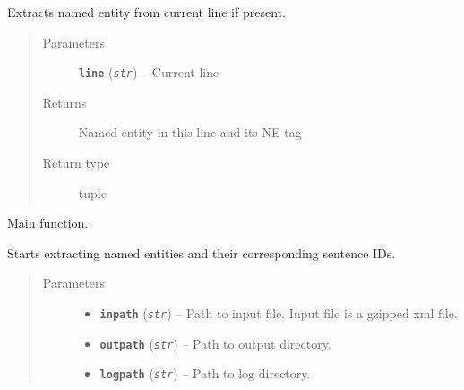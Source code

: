 \documentclass[letterpaper,10pt,english]{sphinxmanual}
\begin{document}
\begin{fulllineitems}
\label{src.prep.nes:src.prep.nes.extract_nes.extract_named_entity}
Extracts named entity from current line if present.
\begin{quote}\begin{description}
\item[{Parameters}] \leavevmode
\textbf{\texttt{line}} (\emph{\texttt{str}}) -- Current line

\item[{Returns}] \leavevmode
Named entity in this line and its NE tag

\item[{Return type}] \leavevmode
tuple

\end{description}\end{quote}

\end{fulllineitems}


\begin{fulllineitems}
\label{src.prep.nes:src.prep.nes.extract_nes.main}
Main function.

\end{fulllineitems}


\begin{fulllineitems}
\label{src.prep.nes:src.prep.nes.extract_nes.process}
Starts extracting named entities and their corresponding sentence IDs.
\begin{quote}\begin{description}
\item[{Parameters}] \leavevmode\begin{itemize}
\item {} 
\textbf{\texttt{inpath}} (\emph{\texttt{str}}) -- Path to input file. Input file is a gzipped xml file.

\item {} 
\textbf{\texttt{outpath}} (\emph{\texttt{str}}) -- Path to output directory.

\item {} 
\textbf{\texttt{logpath}} (\emph{\texttt{str}}) -- Path to log directory.

\end{itemize}

\end{description}\end{quote}

\end{fulllineitems}
\end{document}

